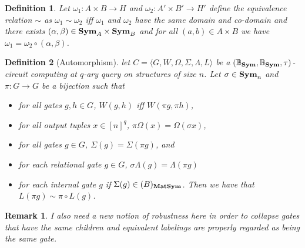 \documentclass[12pt]{report}
\newtheorem{remark}{Remark} \newtheorem{definition}{Definition}
\newcommand{\sym}{\text{\textbf{Sym}}}
\newcommand{\matsym}{\text{\textbf{MatSym}}}
\begin{document}
\begin{definition}
  Let $\omega_1: A \times B \rightarrow H$ and $\omega_2: A' \times B'
  \rightarrow H'$ define the equivalence relation $\sim$ as $\omega_1 \sim
  \omega_2$ iff $\omega_1$ and $\omega_2$ have the same domain and co-domain and
  there exists $(\alpha, \beta) \in \sym_A \times \sym_B$ and for all $(a,b) \in
  A \times B$ we have $\omega_1 = \omega_2 \circ (\alpha, \beta)$.
\end{definition}


\begin{definition}[Automorphism]
  let $C = \langle G, W, \Omega, \Sigma, \Lambda, L\rangle$ be a
  $(\mathbb{B}_\sym, \mathbb{B}_\sym, \tau)$-circuit computing at $q$-ary query
  on structures of size $n$. Let $\sigma \in \sym_n$ and $\pi: G \rightarrow G$
  be a bijection such that
  \begin{itemize}
  \item for all gates $g, h \in G$, $W(g,h)$ iff $W(\pi g, \pi h)$,
  \item for all output tuples $x \in [n]^q$, $\pi \Omega (x) = \Omega (\sigma
    x)$,
  \item for all gates $g \in G$, $\Sigma (g) = \Sigma (\pi g)$, and
  \item for each relational gate $g \in G$, $\sigma \Lambda (g) = \Lambda (\pi
    g)$
  \item for each internal gate $g$ if $\Sigma (g) \in \mathbb(B)_\matsym$. Then
    we have that $L(\pi g) \sim \pi \circ L(g)$.
  \end{itemize}
\end{definition}

\begin{remark}
  I also need a new notion of robustness here in order to collapse gates that
  have the same children and equivalent labelings are properly regarded as being
  the same gate.
\end{remark}
\end{document}
